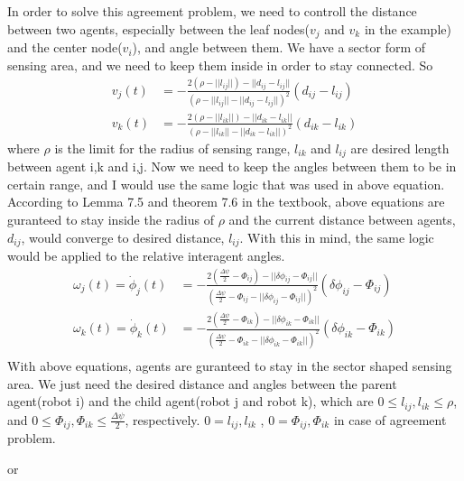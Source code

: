 \documentclass{article}
\begin{document}
\begin{problem}
    \vspace{12pt}
    In order to solve this agreement problem, we need to controll the distance between two agents, especially between the leaf nodes($v_j$ and $v_k$ in the example) and the center node($v_i$), and angle between them. We have a sector form of sensing area, and we need to keep them inside in order to stay connected. So 
    \begin{align*}
        v_j(t) &= - \frac{2(\rho - ||l_{ij}||) - ||d_{ij} - l_{ij}||}{(\rho - ||l_{ij}|| - ||d_{ij} - l_{ij}||)^2} (d_{ij} - l_{ij} )\\
        v_k(t) &= - \frac{2(\rho - ||l_{ik}||) - ||d_{ik} - l_{ik}||}{(\rho - ||l_{ik}|| - ||d_{ik} - l_{ik}||)^2} (d_{ik} - l_{ik} )
    \end{align*}
    where $\rho$ is the limit for the radius of sensing range, $l_{ik}$ and $l_{ij}$ are desired length between agent i,k and i,j.
    Now we need to keep the angles between them to be in certain range, and I would use the same logic that was used in above equation. According to Lemma 7.5 and theorem 7.6 in the textbook, above equations are guranteed to stay inside the radius of $\rho$ and the current distance between agents, $d_{ij}$, would converge to desired distance, $l_{ij}$. With this in mind, the same logic would be applied to the relative interagent angles. 
    \begin{align*}
        \omega_j(t) = \dot \phi_j(t) &= - \frac{2(\frac{\Delta \psi}{2} - \Phi_{ij}) - ||\delta \phi_{ij} - \Phi_{ij}||}{(\frac{\Delta \psi}{2} - \Phi_{ij} - ||\delta \phi_{ij} - \Phi_{ij}||)^2} (\delta \phi_{ij} - \Phi_{ij})\\
        \omega_k(t) = \dot \phi_k(t) &= - \frac{2(\frac{\Delta \psi}{2} - \Phi_{ik}) - ||\delta \phi_{ik} - \Phi_{ik}||}{(\frac{\Delta \psi}{2} - \Phi_{ik} - ||\delta \phi_{ik} - \Phi_{ik}||)^2} (\delta \phi_{ik} - \Phi_{ik})\\
    \end{align*}
    With above equations, agents are guranteed to stay in the sector shaped sensing area. We just need the desired distance and angles between the parent agent(robot i) and the child agent(robot j and robot k), which are $0 \leq l_{ij}, l_{ik} \leq \rho$, and $0 \leq \Phi_{ij}, \Phi_{ik} \leq \frac{\Delta \psi}{2}$, respectively. $0 = l_{ij}, l_{ik}$ , $0 = \Phi_{ij}, \Phi_{ik}$ in case of agreement problem.

    or



\end{problem}
\end{document}
